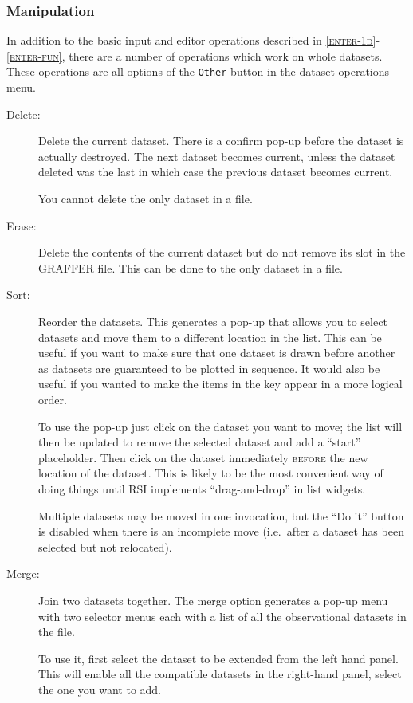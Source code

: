 \documentclass[11pt,twoside,english]{article}
\begin{document}
\subsubsection{Manipulation}

In addition to the basic input and editor operations described in
\textsc{\autoref{enter-1d}-\autoref{enter-fun}}, there are a number of
operations which work on whole datasets. These operations are all
options of the \texttt{Other} button in the dataset operations menu.

\begin{description}
\item [Delete:]Delete the current dataset. There is a confirm pop-up
  before the dataset is actually destroyed. The next dataset becomes
  current, unless the dataset deleted was the last in which case the
  previous dataset becomes current.


  You cannot delete the only dataset in a file.

\item [Erase:]Delete the contents of the current dataset but do not
  remove its slot in the GRAFFER file. This can be done to the only
  dataset in a file.
\item [Sort:]Reorder the datasets. This generates a pop-up that allows
  you to select datasets and move them to a different location in the
  list. This can be useful if you want to make sure that one dataset is
  drawn before another as datasets are guaranteed to be plotted in
  sequence. It would also be useful if you wanted to make the items in
  the key appear in a more logical order.


  To use the pop-up just click on the dataset you want to move; the
  list will then be updated to remove the selected dataset and add a
  ``start'' placeholder. Then click on the dataset immediately
  \textsc{before} the new location of the dataset. This is likely to be
  the most convenient way of doing things until RSI implements
  ``drag-and-drop'' in list widgets.

  Multiple datasets may be moved in one invocation, but the ``Do it''
  button is disabled when there is an incomplete move (i.e.\ after a
  dataset has been selected but not relocated).

\item [Merge:]Join two datasets together. The merge option generates a
  pop-up menu with two selector menus each with a list of all the
  observational datasets in the file.


  To use it, first select the dataset to be extended from the left hand
  panel. This will enable all the compatible datasets in the right-hand
  panel, select the one you want to add. 


\end{description}
\end{document}
